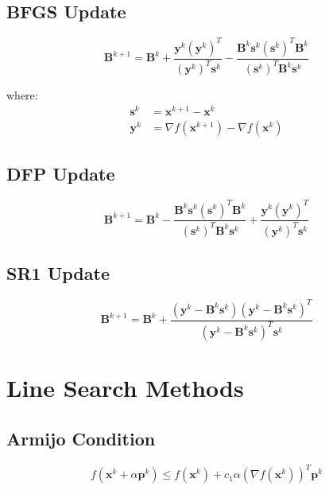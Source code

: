 \documentclass{article}
\begin{document}
\subsection{BFGS Update}
\begin{equation}
\mathbf{B}^{k+1} = \mathbf{B}^k + \frac{\mathbf{y}^k (\mathbf{y}^k)^T}{(\mathbf{y}^k)^T \mathbf{s}^k} - \frac{\mathbf{B}^k \mathbf{s}^k (\mathbf{s}^k)^T \mathbf{B}^k}{(\mathbf{s}^k)^T \mathbf{B}^k \mathbf{s}^k}
\end{equation}

where:
\begin{align}
\mathbf{s}^k &= \mathbf{x}^{k+1} - \mathbf{x}^k \\
\mathbf{y}^k &= \nabla f(\mathbf{x}^{k+1}) - \nabla f(\mathbf{x}^k)
\end{align}

\subsection{DFP Update}
\begin{equation}
\mathbf{B}^{k+1} = \mathbf{B}^k - \frac{\mathbf{B}^k \mathbf{s}^k (\mathbf{s}^k)^T \mathbf{B}^k}{(\mathbf{s}^k)^T \mathbf{B}^k \mathbf{s}^k} + \frac{\mathbf{y}^k (\mathbf{y}^k)^T}{(\mathbf{y}^k)^T \mathbf{s}^k}
\end{equation}

\subsection{SR1 Update}
\begin{equation}
\mathbf{B}^{k+1} = \mathbf{B}^k + \frac{(\mathbf{y}^k - \mathbf{B}^k \mathbf{s}^k)(\mathbf{y}^k - \mathbf{B}^k \mathbf{s}^k)^T}{(\mathbf{y}^k - \mathbf{B}^k \mathbf{s}^k)^T \mathbf{s}^k}
\end{equation}

\section{Line Search Methods}

\subsection{Armijo Condition}
\begin{equation}
f(\mathbf{x}^k + \alpha \mathbf{p}^k) \leq f(\mathbf{x}^k) + c_1 \alpha (\nabla f(\mathbf{x}^k))^T \mathbf{p}^k
\end{equation}
\end{document}
